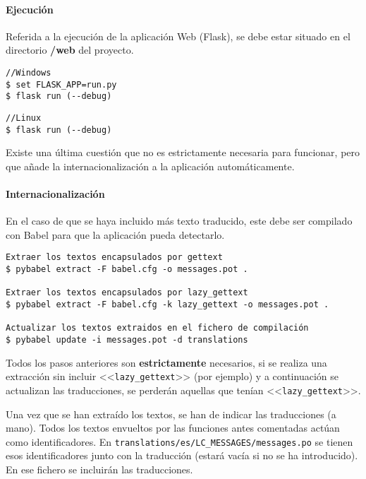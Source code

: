 \paragraph{Ejecución} Referida a la ejecución de la aplicación Web (Flask), se
debe estar situado en el directorio \textbf{/web} del proyecto.
\begin{tcolorbox}[colback=cyan!5!white,colframe=cyan!75!black,fontupper=\footnotesize,fontlower=\footnotesize,title=Ejecución]
\begin{verbatim}
//Windows
$ set FLASK_APP=run.py
$ flask run (--debug)
\end{verbatim}
\tcblower
\begin{verbatim}
//Linux
$ flask run (--debug)
\end{verbatim}
\label{ejecucion}
\end{tcolorbox}

Existe una última cuestión que no es estrictamente necesaria para funcionar,
pero que añade la internacionalización a la aplicación automáticamente.

\paragraph{Internacionalización} En el caso de que se haya incluido más texto
traducido, este debe ser compilado con Babel para que la aplicación pueda
detectarlo.

\begin{tcolorbox}[colback=cyan!5!white,colframe=cyan!75!black,fontupper=\footnotesize,title=Proceso de internacionalización (desde \texttt{/web/app})]
\begin{verbatim}
Extraer los textos encapsulados por gettext
$ pybabel extract -F babel.cfg -o messages.pot .

Extraer los textos encapsulados por lazy_gettext
$ pybabel extract -F babel.cfg -k lazy_gettext -o messages.pot .

Actualizar los textos extraidos en el fichero de compilación
$ pybabel update -i messages.pot -d translations
\end{verbatim}
\end{tcolorbox}

Todos los pasos anteriores son \textbf{estrictamente} necesarios, si se realiza
una extracción sin incluir <<\texttt{lazy\_gettext}>> (por ejemplo) y a
continuación se actualizan las traducciones, se perderán aquellas que tenían
<<\texttt{lazy\_gettext}>>.

Una vez que se han extraído los textos, se han de indicar las traducciones (a
mano). Todos los textos envueltos por las funciones antes comentadas actúan como
identificadores. En \texttt{translations/es/LC\_MESSAGES/messages.po} se tienen
esos identificadores junto con la traducción (estará vacía si no se ha
introducido). En ese fichero se incluirán las traducciones.

